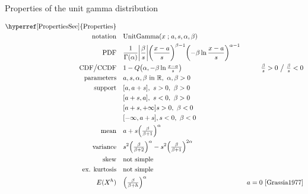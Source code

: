 

\begin{table*}[t!]
\caption[Unit gamma distribution -- Properties]{Properties of the unit gamma distribution}
\begin{align*}
\text{\hyperref[PropertiesSec]{Properties}}  \quad& \\
\text{notation} \quad & \text{UnitGamma}(x\given a,s,\alpha,\beta) 
\\
\text{PDF}\quad &  \frac{1}{\Gamma(\alpha)} \Left|\frac{\beta}{ s}\Right|
\Left(\frac{x-a}{s}\Right)^{\beta-1} \Left(-\beta \ln   \frac{x-a}{s} \Right)^{\alpha-1} \checked
\\
\text{CDF} \big/ \text{CCDF}  \quad  & 1-Q\Left(\alpha, -\beta \ln \tfrac{x-a}{s} \Right)
& \tfrac{\beta}{s}  >0 \ \big{/} \ \tfrac{\beta}{s}<0   \checked
\\
\text{parameters}\quad &   a, s,\alpha,\beta \text{ in } \Real  ,\  \alpha, \beta>0
\\
\text{support}\checked \quad 
	&   [a,a+s] ,\ s>0,\ \beta>0 \\
	&  [a+s,a], \ s<0,\ \beta>0 \\
	& [a+s,+\infty]  s>0,\ \beta<0  \\
 	& [-\infty,a+s], s<0,\ \beta<0 \\
\text{mean} \quad  &  a + s \Left(\tfrac{\beta}{\beta+1} \Right)^{\alpha} \checked
\\
\text{variance} \quad  & s^2 \Left(\tfrac{\beta}{\beta+2} \Right)^{\alpha} - s^2 \Left(\tfrac{\beta}{\beta+1} \Right)^{2\alpha} \checked
\\
\text{skew} \quad  &   \text{not simple}
\\
\text{ex. kurtosis} \quad  &   \text{not simple}
\\
E(X^h) \quad & \Left(\tfrac{\beta}{\beta+h} \Right)^{\alpha} \qquad  & a=0 \
\text{\cite{Grassia1977}} \checked
\end{align*}
\end{table*}